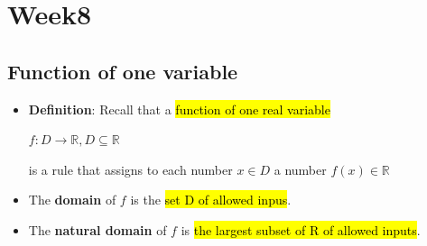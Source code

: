 \documentclass{article}
\begin{document}
      



\section{Week8}
  \subsection*{Function of one variable}
  \begin{itemize}
  	\item \textbf{Definition}: Recall that a \hl{function of one real variable}
  		\begin{center}
  			$f: D \rightarrow \mathbb{R}, D \subseteq \mathbb{R}$
  		\end{center}
  		is a rule that assigns to each number $x \in D$ a number $f(x) \in \mathbb{R}$
  	\item The \textbf{domain} of $f$ is the \hl{set D of allowed inpus}.
  	\item The \textbf{natural domain} of $f$ is \hl{the largest subset of R of allowed inputs}.
  \end{itemize}
\end{document}
